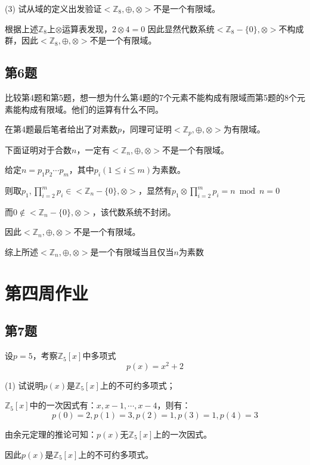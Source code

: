(3) 试从域的定义出发验证$<\mathbb{Z}_8, \oplus, \otimes>$不是一个有限域。

\begin{Solution}
    根据上述$\mathbb{Z}_8$上$\otimes$运算表发现，$2\otimes 4 =0$
因此显然代数系统$<\mathbb{Z}_8-\{0\}, \otimes>$不构成群，因此$<\mathbb{Z}_8, \oplus, \otimes>$不是一个有限域。
\end{Solution}

\newpage
\section{第6题}
比较第4题和第5题，想一想为什么第4题的7个元素不能构成有限域而第5题的8个元素能构成有限域。他们的运算有什么不同。

\begin{Solution}
    在第4题最后笔者给出了对素数$p$，同理可证明$<\mathbb{Z}_p, \oplus, \otimes>$为有限域。

    下面证明对于合数$n$，一定有$<\mathbb{Z}_n, \oplus, \otimes>$不是一个有限域。

    给定$n = p_1p_2\cdots p_m$，其中$p_i(1\le i \le m)$为素数。
    
    则取$p_1,\prod_{i=2}^mp_i\in <\mathbb{Z}_n - \{0\}, \otimes>$，显然有$p_1\otimes\prod_{i=2}^mp_i = n \bmod n = 0$

    而$0\notin <\mathbb{Z}_n - \{0\}, \otimes>$，该代数系统不封闭。
    
    因此$<\mathbb{Z}_n, \oplus, \otimes>$不是一个有限域。

    综上所述$<\mathbb{Z}_n, \oplus, \otimes>$是一个有限域当且仅当$n$为素数
\end{Solution}

\newpage
\chapter{第四周作业}
\section{第7题}
设$p=5$，考察$\mathbb{Z}_5[x]$中多项式
\begin{equation}
    p(x) = x^2 + 2
\end{equation}

(1) 试说明$p(x)$是$\mathbb{Z}_5[x]$上的不可约多项式；

\begin{Solution}
    $\mathbb{Z}_5[x]$中的一次因式有：$x,x-1,\cdots,x-4$，则有：
    \begin{equation}
        p(0) = 2, p(1) = 3, p(2) = 1, p(3) = 1, p(4) = 3
    \end{equation}
    
    由余元定理的推论可知：$p(x)$无$\mathbb{Z}_5[x]$上的一次因式。

    因此$p(x)$是$\mathbb{Z}_5[x]$上的不可约多项式。
\end{Solution}

